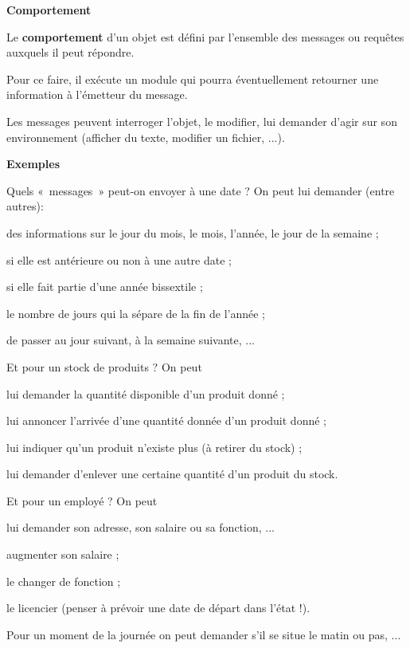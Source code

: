 \bigskip

{\sffamily\bfseries\upshape
Comportement}

{Le \textbf{comportement} d'un objet est défini par
l'ensemble des messages ou requêtes auxquels il peut
répondre.}

Pour ce faire, il exécute un module qui pourra
éventuellement retourner une information à l'émetteur
du message.

Les messages peuvent interroger l'objet, le modifier,
lui demander d'agir sur son environnement (afficher du
texte, modifier un fichier, ...). 

{
\textbf{Exemples} }

\begin{liste}
	\item {
		Quels «~messages~» peut-on envoyer à une date ? On peut lui demander
		(entre autres):}
			\begin{liste}
				\item {
					des informations sur le jour du mois, le mois, l'année,
					le jour de la semaine ; }
				\item {
					si elle est antérieure ou non à une autre date ;}
				\item {
					si elle fait partie d'une année bissextile ; }
				\item {
					le nombre de jours qui la sépare de la fin de l'année
					;}
				\item {
					de passer au jour suivant, à la semaine suivante, ...}
			\end{liste}
	\item 
		Et pour un stock de produits ? On peut 
		\begin{liste}
			\item {
				lui demander la quantité disponible d'un produit donné
				;}
			\item {
				lui annoncer l'arrivée d'une quantité
				donnée d'un produit donné ;}
			\item {
				lui indiquer qu'un produit n'existe
				plus (à retirer du stock) ;}
			\item {
				lui demander d'enlever une certaine quantité
				d'un produit du stock.}
		\end{liste}
	\item {
		Et pour un employé ? On peut}
		\begin{liste}
			\item {
				lui demander son adresse, son salaire ou sa fonction, ...}
			\item {
				augmenter son salaire ;}
			\item {
				le changer de fonction ;}
			\item {
				le licencier (penser à prévoir une date de départ dans
				l'état !).}
		\end{liste}
	\item {
		Pour un moment de la journée on peut demander s'il se
		situe le matin ou pas, ...}	
\end{liste}

